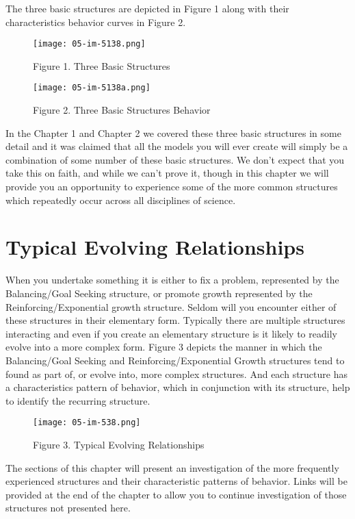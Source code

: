 \documentclass[]{memoir}
\makeatletter
\def\maxwidth{\ifdim\Gin@nat@width>\linewidth\linewidth
\else\Gin@nat@width\fi}
\let\Oldincludegraphics\includegraphics
\renewcommand{\includegraphics}[1]{\Oldincludegraphics[width=\maxwidth]{#1}}
\makeatother
\begin{document}
The three basic structures are depicted in Figure 1 along with their
characteristics behavior curves in Figure 2.

\begin{figure}[htbp]
\centering
\texttt{[image: 05-im-5138.png]}
\caption{Figure 1. Three Basic Structures}
\end{figure}

\begin{figure}[htbp]
\centering
\texttt{[image: 05-im-5138a.png]}
\caption{Figure 2. Three Basic Structures Behavior}
\end{figure}

In the Chapter 1 and Chapter 2 we covered these three basic structures
in some detail and it was claimed that all the models you will ever
create will simply be a combination of some number of these basic
structures. We don't expect that you take this on faith, and while we
can't prove it, though in this chapter we will provide you an
opportunity to experience some of the more common structures which
repeatedly occur across all disciplines of science.

\section{Typical Evolving Relationships}

When you undertake something it is either to fix a problem, represented
by the Balancing/Goal Seeking structure, or promote growth represented
by the Reinforcing/Exponential growth structure. Seldom will you
encounter either of these structures in their elementary form. Typically
there are multiple structures interacting and even if you create an
elementary structure is it likely to readily evolve into a more complex
form. Figure 3 depicts the manner in which the Balancing/Goal Seeking
and Reinforcing/Exponential Growth structures tend to found as part of,
or evolve into, more complex structures. And each structure has a
characteristics pattern of behavior, which in conjunction with its
structure, help to identify the recurring structure.

\begin{figure}[htbp]
\centering
\texttt{[image: 05-im-538.png]}
\caption{Figure 3. Typical Evolving Relationships}
\end{figure}

The sections of this chapter will present an investigation of the more
frequently experienced structures and their characteristic patterns of
behavior. Links will be provided at the end of the chapter to allow you
to continue investigation of those structures not presented here.
\end{document}
